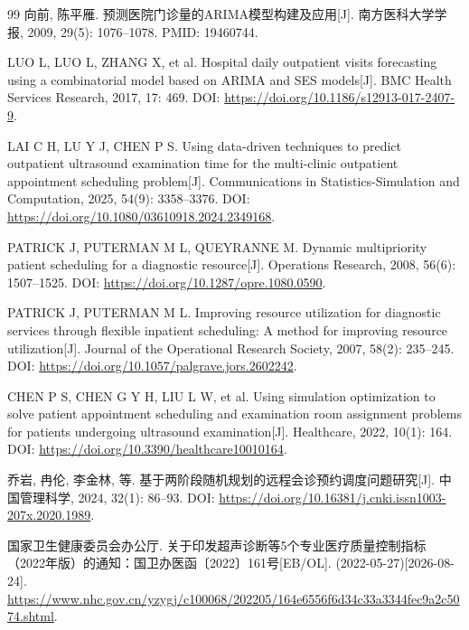 \begin{thebibliography}{99}
向前, 陈平雁. 预测医院门诊量的ARIMA模型构建及应用[J]. 南方医科大学学报, 2009, 29(5): 1076--1078. PMID: 19460744.

LUO L, LUO L, ZHANG X, et al. Hospital daily outpatient visits forecasting using a combinatorial model based on ARIMA and SES models[J]. BMC Health Services Research, 2017, 17: 469. DOI: \url{https://doi.org/10.1186/s12913-017-2407-9}.

LAI C H, LU Y J, CHEN P S. Using data-driven techniques to predict outpatient ultrasound examination time for the multi-clinic outpatient appointment scheduling problem[J]. Communications in Statistics-Simulation and Computation, 2025, 54(9): 3358--3376. DOI: \url{https://doi.org/10.1080/03610918.2024.2349168}.

PATRICK J, PUTERMAN M L, QUEYRANNE M. Dynamic multipriority patient scheduling for a diagnostic resource[J]. Operations Research, 2008, 56(6): 1507--1525. DOI: \url{https://doi.org/10.1287/opre.1080.0590}.

PATRICK J, PUTERMAN M L. Improving resource utilization for diagnostic services through flexible inpatient scheduling: A method for improving resource utilization[J]. Journal of the Operational Research Society, 2007, 58(2): 235--245. DOI: \url{https://doi.org/10.1057/palgrave.jors.2602242}.

CHEN P S, CHEN G Y H, LIU L W, et al. Using simulation optimization to solve patient appointment scheduling and examination room assignment problems for patients undergoing ultrasound examination[J]. Healthcare, 2022, 10(1): 164. DOI: \url{https://doi.org/10.3390/healthcare10010164}.

乔岩, 冉伦, 李金林, 等. 基于两阶段随机规划的远程会诊预约调度问题研究[J]. 中国管理科学, 2024, 32(1): 86--93. DOI: \url{https://doi.org/10.16381/j.cnki.issn1003-207x.2020.1989}.

国家卫生健康委员会办公厅. 关于印发超声诊断等5个专业医疗质量控制指标（2022年版）的通知：国卫办医函〔2022〕161号[EB/OL]. (2022-05-27)[2026-08-24]. \url{https://www.nhc.gov.cn/yzygj/c100068/202205/164e6556f6d34c33a3344fec9a2c5074.shtml}.

\end{thebibliography}
\endgroup
